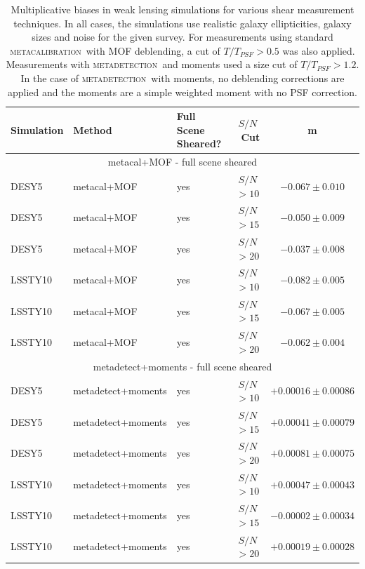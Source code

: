 \documentclass[fleqn,useAMS,usenatbib]{mnras}
\newcommand{\snr}{$S/N$}
\newcommand{\mcal}{\textsc{metacalibration}}
\newcommand{\mdet}{\textsc{metadetection}}
\begin{document}
\begin{table}
  \centering
  \caption{
    Multiplicative biases in weak lensing simulations for various shear
    measurement techniques. In all cases, the simulations use realistic
    galaxy ellipticities, galaxy sizes and noise for the given survey. For measurements using standard \mcal\ with
    MOF deblending, a cut of $T/T_{PSF} > 0.5$ was also applied. Measurements with
    \mdet\ and moments used a size cut of $T/T_{PSF} > 1.2$. In the case of \mdet\ with moments,
    no deblending corrections are applied and the moments are a simple weighted moment
    with no PSF correction.}
  \label{tab:shearmeas}

  \begin{tabular}{|l|l|l|c|c|}
    \hline
    Simulation & Method & Full Scene Sheared? & \snr\ Cut & m \\
    \hline

    \hline
    \multicolumn{5}{c}{metacal+MOF - full scene sheared}\\
    \hline
    DESY5   & metacal+MOF & yes & \snr$ > 10$ & $-0.067 \pm 0.010$  \\
    DESY5   & metacal+MOF & yes & \snr$ > 15$ & $-0.050 \pm 0.009$  \\
    DESY5   & metacal+MOF & yes & \snr$ > 20$ & $-0.037 \pm 0.008$  \\
    \hline
    LSSTY10  & metacal+MOF & yes & \snr$ > 10$ & $-0.082 \pm 0.005$  \\
    LSSTY10  & metacal+MOF & yes & \snr$ > 15$ & $-0.067 \pm 0.005$  \\
    LSSTY10  & metacal+MOF & yes & \snr$ > 20$ & $-0.062 \pm 0.004$  \\
    \hline

    \hline
    \multicolumn{5}{c}{metadetect+moments - full scene sheared}\\
    \hline
    DESY5   & metadetect+moments & yes & \snr$ > 10$ & $+0.00016 \pm 0.00086$  \\
    DESY5   & metadetect+moments & yes & \snr$ > 15$ & $+0.00041 \pm 0.00079$  \\
    DESY5   & metadetect+moments & yes & \snr$ > 20$ & $+0.00081 \pm 0.00075$  \\
    \hline
    LSSTY10  & metadetect+moments & yes & \snr$ > 10$ & $+0.00047 \pm 0.00043$  \\
    LSSTY10  & metadetect+moments & yes & \snr$ > 15$ & $-0.00002 \pm 0.00034$  \\
    LSSTY10  & metadetect+moments & yes & \snr$ > 20$ & $+0.00019 \pm 0.00028$  \\
    \hline


\end{tabular}
\end{table}
\end{document}
